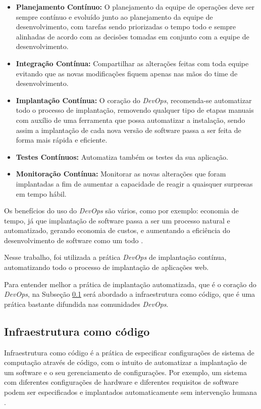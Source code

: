  \begin{itemize}
   \item \textbf{Planejamento Contínuo:} O planejamento da equipe de operações 
deve ser sempre contínuo
   e evoluído junto ao planejamento da equipe de desenvolvimento, com tarefas
   sendo priorizadas o tempo todo e sempre alinhadas de acordo com as decisões tomadas
   em conjunto com a equipe de desenvolvimento.
   \item \textbf{Integração Contínua:} Compartilhar as alterações feitas com toda equipe
   evitando que as novas modificações fiquem apenas nas mãos do time de desenvolvimento.
   \item \textbf{Implantação Contínua:} O coração do \textit{DevOps}, recomenda-se automatizar
   todo o processo de implantação, removendo qualquer tipo de etapas manuais com auxílio
   de uma ferramenta que possa automatizar a instalação, sendo assim a implantação
   de cada nova versão de software passa a ser feita de forma mais rápida e eficiente.
   \item \textbf{Testes Contínuos:} Automatiza também os testes da sua aplicação.
   \item \textbf{Monitoração Contínua:} Monitorar as novas alterações
   que foram implantadas a fim de aumentar a capacidade de reagir a quaisquer surpresas
   em tempo hábil.
 \end{itemize}

Os benefícios do uso do \textit{DevOps} são vários, como por exemplo: economia de tempo,
já que implantação de software passa a ser um processo natural e automatizado, gerando economia de custos, e 
aumentando a eficiência do desenvolvimento de software como um todo \cite{7173368}.

Nesse trabalho, foi utilizada a prática \textit{DevOps} de implantação contínua,
automatizando todo o processo de implantação de aplicações web. 

Para entender melhor a prática de implantação automatizada, que é o coração
do \textit{DevOps}, na Subseção \ref{subsub:infracode} será abordado a infraestrutura
como código, que é uma prática bastante difundida nas comunidades \textit{DevOps}.

\subsection{Infraestrutura como código}
\label{subsub:infracode}
Infraestrutura como código é a prática de especificar configurações de
sistema de computação através de código, com o intuito de automatizar a implantação
de um software e o seu gerenciamento de configurações. Por exemplo, um sistema
com diferentes configurações de hardware e diferentes
requisitos de software podem ser especificados e implantados automaticamente
sem intervenção humana \cite{configurationcodesmell}. 

